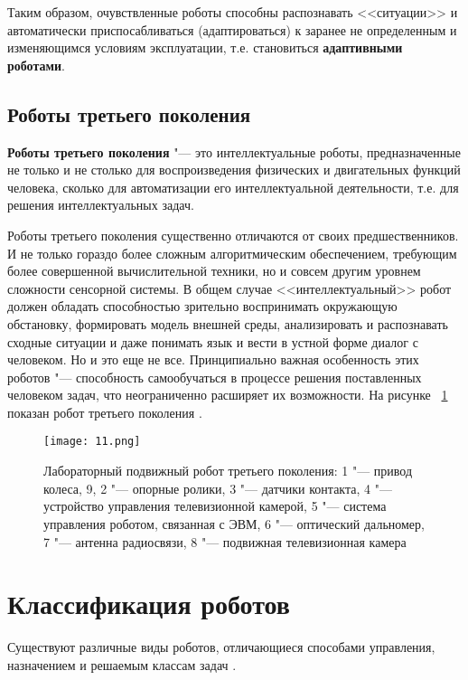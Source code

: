 \documentclass[bachelor, och, referat]{SCWorks}
\begin{document}
Таким образом, очувствленные роботы способны распознавать <<ситуации>> и
автоматически приспосабливаться (адаптироваться) к заранее не определенным и
изменяющимся условиям эксплуатации, т.е. становиться \textbf{адаптивными роботами}.

\subsection{Роботы третьего поколения}

\textbf{Роботы третьего поколения} "--- это интеллектуальные роботы,
предназначенные не только и не столько для воспроизведения физических и
двигательных функций человека, сколько для автоматизации его интеллектуальной
деятельности, т.е. для решения интеллектуальных задач. 

Роботы третьего поколения существенно отличаются от своих предшественников. И не
только гораздо более сложным алгоритмическим обеспечением, требующим более
совершенной вычислительной техники, но и совсем другим уровнем сложности
сенсорной системы. В общем случае <<интеллектуальный>> робот должен обладать
способностью зрительно воспринимать окружающую обстановку, формировать модель
внешней среды, анализировать и распознавать сходные ситуации и даже понимать
язык и вести в устной форме диалог с человеком. Но и это еще не все.
Принципиально важная особенность этих роботов "--- способность самообучаться в
процессе решения поставленных человеком задач, что неограниченно расширяет их
возможности. На рисунке ~\ref{fig:11} показан робот третьего поколения \cite{11}.

\begin{figure}[h!]
    \centering
    \texttt{[image: 11.png]}
    \caption{\label{fig:11}%
    Лабораторный подвижный робот третьего поколения: 1 "--- привод колеса, 9, 2 "---
    опорные ролики, 3 "--- датчики контакта, 4 "--- устройство управления
    телевизионной камерой, 5 "--- система управления роботом, связанная с ЭВМ, 6 "---
    оптический дальномер, 7 "--- антенна радиосвязи, 8 "--- подвижная телевизионная
    камера}
\end{figure}

\section{Классификация роботов}

Существуют различные виды роботов, отличающиеся способами управления,
назначением и решаемым классам задач \cite{5}. 
\end{document}
